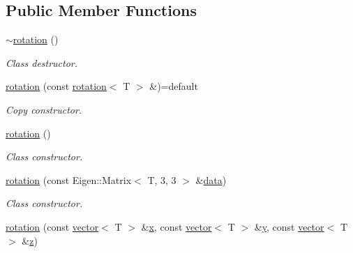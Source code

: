 \subsection*{Public Member Functions}
\begin{DoxyCompactItemize}
\item 
\mbox{\label{classddd_1_1rotation_a35f5c1346155a56b191f297b6578aa31}} 
\hyperlink{classddd_1_1rotation_a35f5c1346155a56b191f297b6578aa31}{$\sim$rotation} ()
\begin{DoxyCompactList}\small\item\em Class destructor. \end{DoxyCompactList}\item 
\mbox{\label{classddd_1_1rotation_a8f53c26dd4172728641b5cd29b2e1c7b}} 
\hyperlink{classddd_1_1rotation_a8f53c26dd4172728641b5cd29b2e1c7b}{rotation} (const \hyperlink{classddd_1_1rotation}{rotation}$<$ T $>$ \&)=default
\begin{DoxyCompactList}\small\item\em Copy constructor. \end{DoxyCompactList}\item 
\mbox{\label{classddd_1_1rotation_a3c41c8ce3effc94658cf4cf5fa229e65}} 
\hyperlink{classddd_1_1rotation_a3c41c8ce3effc94658cf4cf5fa229e65}{rotation} ()
\begin{DoxyCompactList}\small\item\em Class constructor. \end{DoxyCompactList}\item 
\hyperlink{classddd_1_1rotation_a10b7bcc20f352a49767460ebde9a1fcf}{rotation} (const Eigen\+::\+Matrix$<$ T, 3, 3 $>$ \&\hyperlink{classddd_1_1mat_object_a4e06f4a888443bc139c8081d664b4449}{data})
\begin{DoxyCompactList}\small\item\em Class constructor. \end{DoxyCompactList}\item 
\hyperlink{classddd_1_1rotation_a2b0e5637ae25ce6fc706f50d49f885e7}{rotation} (const \hyperlink{classddd_1_1vector}{vector}$<$ T $>$ \&\hyperlink{classddd_1_1mat_object_ae5d6d780c693c989836db506094a04b1}{x}, const \hyperlink{classddd_1_1vector}{vector}$<$ T $>$ \&\hyperlink{classddd_1_1mat_object_a7122d95c42d387eed62a3d821061a97f}{y}, const \hyperlink{classddd_1_1vector}{vector}$<$ T $>$ \&\hyperlink{classddd_1_1mat_object_a627bb80e18863ae1b6dd9ba19750328b}{z})

\end{DoxyCompactItemize}
